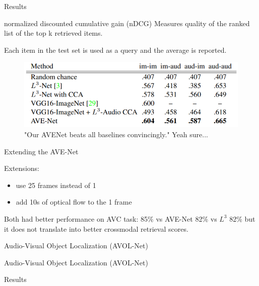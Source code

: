\documentclass{beamer}
\begin{document}
\begin{frame}{Results}
\begin{block}{normalized discounted cumulative gain (nDCG)}
Measures quality of the ranked list of the top k retrieved items.
\end{block}

Each item in the test set is used as a query and the average  is reported.

\begin{figure}[h]
\includegraphics[width=\textwidth]{img/results}
\caption{"Our AVENet
beats all baselines convincingly." \cite{cit:ots} Yeah sure...}
\end{figure}

\end{frame}
\begin{frame}{Extending the AVE-Net}

Extensions:
\begin{itemize}
\item use 25 frames instead of 1
\item add 10s of optical flow to the 1 frame
\end{itemize}

\vfill

Both had better performance on AVC task: 85\% vs AVE-Net 82\% vs $L^3$ 82\% but it does not translate into better crossmodal retrieval scores.

\end{frame}
\begin{frame}{Audio-Visual Object Localization (AVOL-Net)}



\end{frame}
\begin{frame}{Audio-Visual Object Localization (AVOL-Net)}

\end{frame}
\begin{frame}{Results}

\end{frame}
\end{document}
